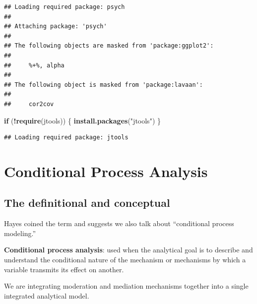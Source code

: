 \documentclass[
  11pt,
]{book}
\newenvironment{Shaded}{\begin{snugshade}}{\end{snugshade}}
\newcommand{\ControlFlowTok}[1]{\textcolor[rgb]{0.27,0.27,0.27}{\textbf{#1}}}
\newcommand{\FunctionTok}[1]{\textcolor[rgb]{0.27,0.27,0.27}{\textbf{#1}}}
\newcommand{\NormalTok}[1]{#1}
\newcommand{\SpecialCharTok}[1]{\textcolor[rgb]{0.43,0.43,0.43}{\textbf{#1}}}
\newcommand{\StringTok}[1]{\textcolor[rgb]{0.5,0.5,0.5}{#1}}
\begin{document}
\begin{verbatim}
## Loading required package: psych
## 
## Attaching package: 'psych'
## 
## The following objects are masked from 'package:ggplot2':
## 
##     %+%, alpha
## 
## The following object is masked from 'package:lavaan':
## 
##     cor2cov
\end{verbatim}

\begin{Shaded}
\begin{Highlighting}[]
\ControlFlowTok{if}\NormalTok{ (}\SpecialCharTok{!}\FunctionTok{require}\NormalTok{(jtools)) \{}
    \FunctionTok{install.packages}\NormalTok{(}\StringTok{"jtools"}\NormalTok{)}
\NormalTok{\}}
\end{Highlighting}
\end{Shaded}

\begin{verbatim}
## Loading required package: jtools
\end{verbatim}

\hypertarget{conditional-process-analysis}{%
\section{Conditional Process Analysis}\label{conditional-process-analysis}}

\hypertarget{the-definitional-and-conceptual-1}{%
\subsection{The definitional and conceptual}\label{the-definitional-and-conceptual-1}}

Hayes \citeyearpar{hayes_introduction_2018} coined the term and suggests we also talk about ``conditional process modeling.''

\textbf{Conditional process analysis}: used when the analytical goal is to describe and understand the conditional nature of the mechanism or mechanisms by which a variable transmits its effect on another.

We are integrating moderation and mediation mechanisms together into a single integrated analytical model.
\end{document}
